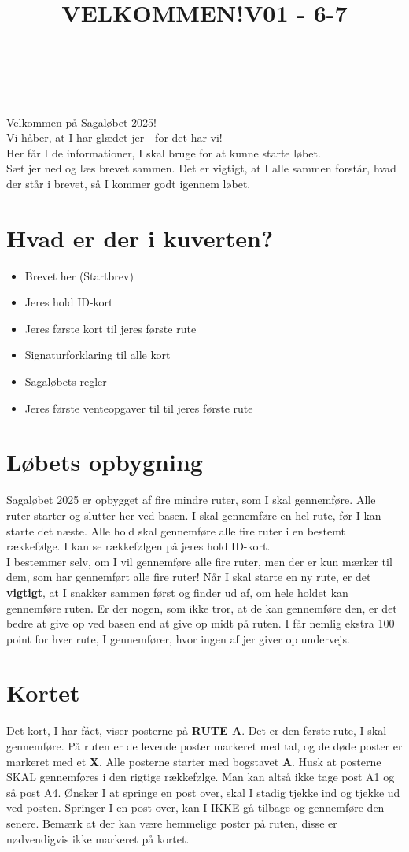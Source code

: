 \title{VELKOMMEN!}\\
\newline
\title{\textcolor{søblå}{V01 - 6-7 }}\\
\newline
Velkommen på Sagaløbet 2025!\\
Vi håber, at I har glædet jer - for det har vi!\\
Her får I de informationer, I skal bruge for at kunne starte løbet.\\
Sæt jer ned og læs brevet sammen. Det er vigtigt, at I alle sammen forstår, hvad der står i brevet, så I kommer godt igennem løbet.
\section{Hvad er der i kuverten?}
\begin{itemize}
    \item Brevet her (Startbrev)
    \item Jeres hold ID-kort
    \item Jeres første kort til jeres første rute
    \item Signaturforklaring til alle kort
    \item Sagaløbets regler
    \item Jeres første venteopgaver til til jeres første rute
\end{itemize}
\section{Løbets opbygning}
Sagaløbet 2025 er opbygget af fire mindre ruter, som I skal gennemføre. Alle ruter starter og slutter her ved basen. I skal gennemføre en hel rute, før I kan starte det næste. Alle hold skal gennemføre alle fire ruter i en bestemt rækkefølge. I kan se rækkefølgen på jeres hold ID-kort.\\\newline
I bestemmer selv, om I vil gennemføre alle fire ruter, men der er kun mærker til dem, som har gennemført alle fire ruter! Når I skal starte en ny rute, er det \textbf{vigtigt}, at I snakker sammen først og finder ud af, om hele holdet kan gennemføre ruten. Er der nogen, som ikke tror, at de kan gennemføre den, er det bedre at give op ved basen end at give op midt på ruten. I får nemlig ekstra 100 point for hver rute, I gennemfører, hvor ingen af jer giver op undervejs.\\
\section{Kortet}
Det kort, I har fået, viser posterne på \textbf{RUTE A}. Det er den første rute, I skal gennemføre. På ruten er de levende poster markeret med tal, og de døde poster er markeret med et \textbf{X}. Alle posterne starter med bogstavet \textbf{A}. Husk at posterne SKAL gennemføres i den rigtige rækkefølge. Man kan altså ikke tage post A1 og så post A4. Ønsker I at springe en post over, skal I stadig tjekke ind og tjekke ud ved posten. Springer I en post over, kan I IKKE gå tilbage og gennemføre den senere. Bemærk at der kan være hemmelige poster på ruten, disse er nødvendigvis ikke markeret på kortet.
